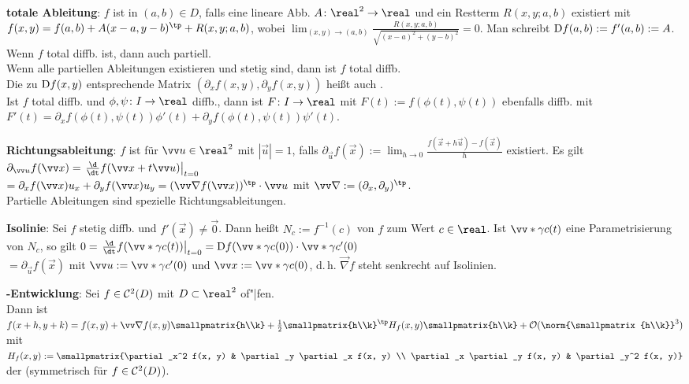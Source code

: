 \linie

\textbf{totale Ableitung}:
$f$ ist  in $(a, b) \in D$, falls eine lineare Abb.
$A\colon \real^2 \to \real$ und ein Restterm $R(x, y; a, b)$ existiert mit
$f(x, y) = f(a, b) + A (x - a, y - b)^\tp + R(x, y; a, b)$, wobei
$\lim_{(x, y) \to (a, b)} \frac{R(x, y; a, b)}{\sqrt{(x - a)^2 + (y - b)^2}} = 0$.
Man schreibt $\mathop{}\!\mathrm{D} f(a, b) := f'(a, b) := A$.\\
Wenn $f$ total diffb. ist, dann auch partiell.\\
Wenn alle partiellen Ableitungen existieren und stetig sind, dann ist $f$ total diffb.\\
Die zu $\mathop{}\!\mathrm{D} f(x, y)$ entsprechende Matrix $(\partial_x f(x, y), \partial_y f(x, y))$
heißt auch .\\
Ist $f$ total diffb. und $\phi, \psi\colon I \to \real$ diffb., dann
ist $F\colon I \to \real$ mit $F(t) := f(\phi(t), \psi(t))$ ebenfalls diffb. mit
$F'(t) = \partial_x f(\phi(t), \psi(t)) \phi'(t) + \partial_y f(\phi(t), \psi(t)) \psi'(t)$.

\linie

\textbf{Richtungsableitung}:
$f$ ist  für $\vec{u} \in \real^2$ mit $|\vec{u}| = 1$,
falls
$\partial_{\vec{u}} f(\vec{x}) := \lim_{h \to 0} \frac{f(\vec{x} + h\vec{u}) - f(\vec{x})}{h}$
existiert.
Es gilt $\partial_{\vec{u}} f(\vec{x})
= \left.\frac{\d}{\dt} f(\vec{x} + t\vec{u})\right|_{t=0}$\\
$= \partial_x f(\vec{x}) u_x + \partial_y f(\vec{x}) u_y
= (\vec{\nabla} f(\vec{x}))^\tp \cdot \vec{u}$
mit $\vec{\nabla} := (\partial_x, \partial_y)^\tp$.\\
Partielle Ableitungen sind spezielle Richtungsableitungen.

\linie

\textbf{Isolinie}:
Sei $f$ stetig diffb. und $f'(\vec{x}) \not= \vec{0}$.
Dann heißt $N_c := f^{-1}(c)$  von $f$ zum Wert $c \in \real$.
Ist $\vecs{\gamma}{c}(t)$ eine Parametrisierung von $N_c$, so gilt
$0 = \left.\frac{\d}{\dt} f(\vecs{\gamma}{c}(t))\right|_{t=0}
= \D f(\vecs{\gamma}{c}(0)) \cdot \vecs{\gamma}{c}'(0)$\\
$= \partial_{\vec{u}} f(\vec{x})$
mit $\vec{u} := \vecs{\gamma}{c}'(0)$ und $\vec{x} := \vecs{\gamma}{c}(0)$,
d.\,h. $\vec{\nabla} f$ steht senkrecht auf Isolinien.

\linie

\textbf{-Entwicklung}:
Sei $f \in \mathcal{C}^2(D)$ mit $D \subset \real^2$ of"|fen.\\
Dann ist $f(x + h, y + k) = f(x, y) + \vec{\nabla} f(x, y) \smallpmatrix{h\\k} +
\frac{1}{2} \smallpmatrix{h\\k}^\tp H_f(x, y) \smallpmatrix{h\\k} +
\O(\norm{\smallpmatrix{h\\k}}^3)$ mit\\
$H_f(x, y) := \smallpmatrix{\partial_x^2 f(x, y) & \partial_y \partial_x f(x, y) \\
\partial_x \partial_y f(x, y) & \partial_y^2 f(x, y)}$ der 
(symmetrisch für $f \in \mathcal{C}^2(D)$).


